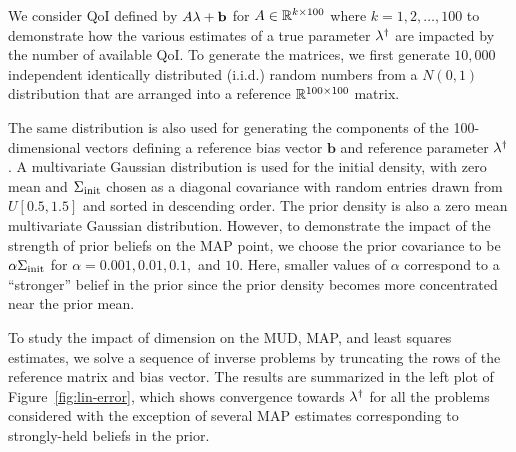 We consider QoI defined by $A\lambda+\mathbf{b}$ for $A\in\mathbb{R}^{k\times 100}$ where $k=1,2,\ldots,100$ to demonstrate how the various estimates of a true parameter $\lambda^\dagger$ are impacted by the number of available QoI.
To generate the matrices, we first generate $10,000$ independent identically distributed (i.i.d.) random numbers from a $N(0,1)$ distribution that are arranged into a reference $\mathbb{R}^{100\times 100}$ matrix.

The same distribution is also used for generating the components of the 100-dimensional vectors defining a reference bias vector $\mathbf{b}$ and reference parameter $\lambda^\dagger$.
A multivariate Gaussian distribution is used for the initial density, with zero mean and $\Sigma_\text{init}$ chosen as a diagonal covariance with random entries drawn from $U[0.5, 1.5]$ and sorted in descending order. %
The prior density is also a zero mean multivariate Gaussian distribution.
However, to demonstrate the impact of the strength of prior beliefs on the MAP point, we choose the prior covariance to be $\alpha\Sigma_\text{init}$  for $\alpha=0.001, 0.01, 0.1, $ and $10$.
Here, smaller values of $\alpha$ correspond to a ``stronger'' belief in the prior since the prior density becomes more concentrated near the prior mean.


To study the impact of dimension on the MUD, MAP, and least squares estimates, we solve a
sequence of inverse problems by truncating the rows of the reference matrix and bias vector.
%
The results are summarized in the left plot of Figure~\ref{fig:lin-error}, which shows convergence towards $\lambda^\dagger$ for all the problems considered with the exception of several MAP estimates corresponding to strongly-held beliefs in the prior.


